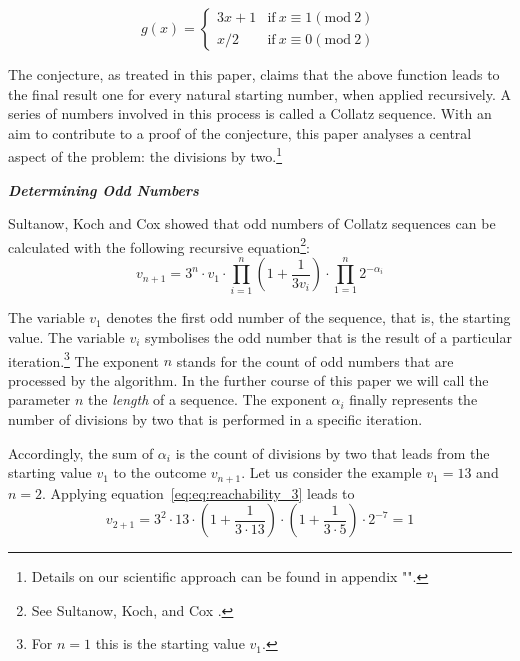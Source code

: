\documentclass{SciPress_2015}
\renewcommand{\subsection}[1]{\textit{\textbf{#1}}}
\begin{document}
\begin{equation}
\label{eq:func_collatz}
g(x)=
\begin{cases}
3x+1	&	\text{if}\ x\equiv 1(\textrm{mod}\ 2)\\
x/2		&	\text{if}\ x\equiv 0(\textrm{mod}\ 2)
\end{cases}
\end{equation}

The conjecture, as treated in this paper, claims that the above function leads to the final result one for every natural starting number, when applied recursively. A series of numbers involved in this process is called a Collatz sequence. With an aim to contribute to a proof of the conjecture, this paper analyses a central aspect of the problem: the divisions by two.\footnote{Details on our scientific approach can be found in appendix "".}

\vspace{1em}\noindent
\subsection{Determining Odd Numbers}
\par\noindent
Sultanow, Koch and Cox showed that odd numbers of Collatz sequences can be calculated with the following recursive equation\footnote{See Sultanow, Koch, and Cox \cite[p.~10]{Ref_Sultanow_Koch_Cox_2020}.}:
\begin{equation}
\label{eq:reachability_3}
v_{n+1}=3^n\cdot v_1\cdot\prod_{i=1}^{n}\left(1+\frac{1}{3v_{i}}\right)\cdot\prod_{1=1}^{n}2^{-\alpha_i}
\end{equation}

The variable $v_1$ denotes the first odd number of the sequence, that is, the starting value. The variable $v_i$ symbolises the odd number that is the result of a particular iteration.\footnote{For $n=1$ this is the starting value $v_1$.} The exponent $n$ stands for the count of odd numbers that are processed by the algorithm. In the further course of this paper we will call the parameter $n$ the \textit{length} of a sequence. The exponent $\alpha_i$ finally represents the number of divisions by two that is performed in a specific iteration.

\newpage
\par\noindent
Accordingly, the sum of $\alpha_i$ is the count of divisions by two that leads from the starting value $v_1$  to the outcome $v_{n+1}$. Let us consider the example $v_1=13$ and $n=2$. Applying equation~\ref{eq:eq:reachability_3} leads to
\[
v_{2+1}=3^2\cdot 13\cdot\left(1+\frac{1}{3\cdot13}\right)\cdot\left(1+\frac{1}{3\cdot5}\right)\cdot2^{-7}=1
\]
\end{document}
